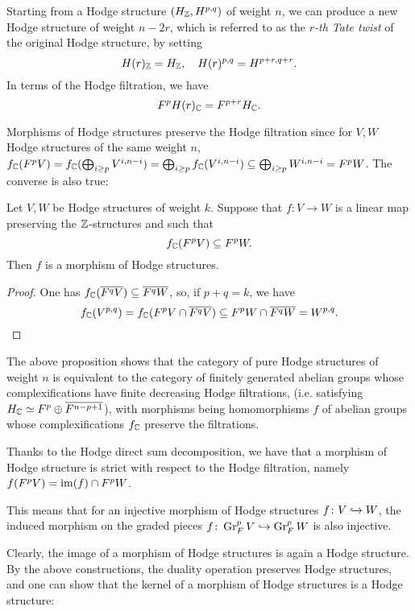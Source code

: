 \documentclass[../main.tex]{subfiles}
\begin{document}
\begin{es} \label{TateTwistDef}
Starting from a Hodge structure $(H_{\mathbb{Z}}, H^{p,q})$ of weight $n$, we can produce a new Hodge structure of weight $n - 2r$, which is referred to as the \emph{$r$-th Tate twist} of the original Hodge structure, by setting
\[
H(r)_{\mathbb{Z}} = H_{\mathbb{Z}}, \quad H(r)^{p,q} = H^{p+r,q+r}. 
\]
In terms of the Hodge filtration, we have
\[
F^p H(r)_{\mathbb{C}} = F^{p+r} H_{\mathbb{C}}.
\]
\end{es}

Morphisms of Hodge structures preserve the Hodge filtration since for $V,W$ Hodge structures of the same weight $n$, $f_{\mathbb{C}}(F^p V) = f_{\mathbb{C}}(\bigoplus_{i \geq p} V^{i,n-i})= \bigoplus_{i \geq p} f_{\mathbb{C}}(V^{i,n-i}) \subseteq \bigoplus_{i \geq p} W^{i,n-i} =F^p W  $. The converse is also true:
\begin{proposition} \label{morHS}
     Let $V,W$ be Hodge structures of weight $k$. Suppose that
$f \colon V \to W$ is a linear map preserving the $\mathbb{Z}$-structures and such that
\[
f_{\mathbb{C}}(F^pV ) \subseteq F^pW.
\]
Then $f$ is a morphism of Hodge structures.
\end{proposition} 
\begin{proof}
    One has $f_{\mathbb{C}} (\overline{F^q V}) \subseteq \overline{F^q W}$, so, if $p + q = k$, we have
    \[
f_{\mathbb{C}}(V^{p,q}) = f_{\mathbb{C}}(F^pV \cap \overline{F^qV} ) \subseteq F^pW \cap \overline{F^qW} = W^{p,q}. 
    \]
\end{proof}

The above proposition shows that the category of pure Hodge structures of weight $n$ is equivalent to the
category of finitely generated abelian groups whose complexifications have finite decreasing Hodge filtrations, (i.e. satisfying $H_{\mathbb{C}} \simeq F^p \oplus \overline{F^{n-p+1}}$), with morphisms being homomorphisms $f$ of abelian groups whose
complexifications $f_{\mathbb{C}}$ preserve the filtrations.

Thanks to the Hodge direct sum decomposition, we have that a morphism of Hodge structure is strict with respect to the Hodge filtration, namely $f(F^pV) = \operatorname{im}(f) \cap F^pW$.

This means that for an injective morphism of Hodge structures $f \colon V \hookrightarrow W$, the induced morphism on the graded pieces $f \colon \operatorname{Gr}^p_F V \hookrightarrow \operatorname{Gr}^p_F W$ is also injective.

Clearly, the image of a morphism of Hodge structures is again a Hodge structure. By the above constructions, the duality operation preserves Hodge structures, and one can show that the kernel of a morphism of Hodge structures is a Hodge structure:
\end{document}
